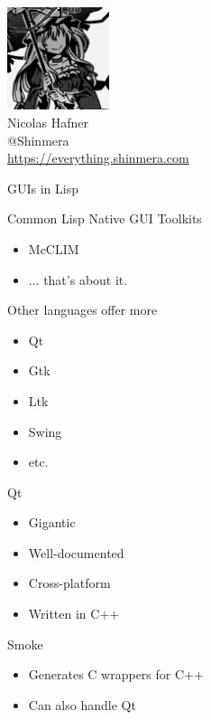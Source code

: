 \documentclass{beamer}
\newcommand{\toptitle}[1]{
  {\Huge #1} \\
  \vspace{0.2cm}
}
\renewcommand{\subtitle}[1]{
  {\Large #1} \\
  \vspace{0.2cm}
}
\begin{document}
\begin{frame}
  \begin{center}
    \includegraphics[height=3cm]{avatar.png}\\
    \vspace{0.2cm}
    {\Large Nicolas Hafner} \\
    \vspace{0.2cm}
    {\Huge @Shinmera} \\
    \vspace{0.2cm}
    \url{https://everything.shinmera.com}
  \end{center}
\end{frame}

\begin{frame}
  \toptitle{GUIs in Lisp}
  Common Lisp Native GUI Toolkits
  \begin{itemize}
  \item McCLIM
    \pause
  \item ... that's about it.
  \end{itemize}
  \vspace{0.5cm}

  \pause
  Other languages offer more
  \begin{itemize}
  \item Qt
  \item Gtk
  \item Ltk
  \item Swing
  \item etc.
  \end{itemize}
\end{frame}

\begin{frame}
  \toptitle{Qt}
  \begin{itemize}
  \item Gigantic
  \item Well-documented
  \item Cross-platform
    \pause
  \item Written in C++
  \end{itemize}
  \vspace{0.5cm}

  \pause
  \subtitle{Smoke}
  \begin{itemize}
  \item Generates C wrappers for C++
  \item Can also handle Qt
  \end{itemize}
\end{frame}
\end{document}
